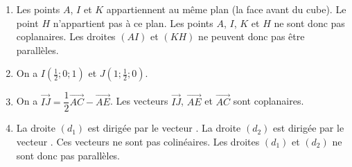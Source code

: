 \documentclass[11pt,fleqn, openany]{book} %
\begin{document}
\begin{solution}\hspace{0pt}

\begin{enumerate}
\item Les points $A$, $I$ et $K$ appartiennent au même plan (la face avant du cube). Le point $H$ n'appartient pas à ce plan. Les points $A$, $I$, $K$ et $H$ ne sont donc pas coplanaires. Les droites $(AI)$ et $(KH)$ ne peuvent donc pas être parallèles.
\item On a $I\left(\frac{1}{2};0;1\right)$ et $J\left(1;\frac{1}{2};0\right)$.
\item On a $\overrightarrow{IJ} = \dfrac{1}{2}\overrightarrow{AC} -  \overrightarrow{AE}$. Les vecteurs $\overrightarrow{IJ}$, $\overrightarrow{AE}$ et $\overrightarrow{AC}$ sont coplanaires.
\item La droite $(d_1)$ est dirigée par le vecteur . La droite $(d_2)$ est dirigée par le vecteur . Ces vecteurs ne sont pas colinéaires. Les droites $(d_1)$ et $(d_2)$ ne sont donc pas parallèles.
\end{enumerate}\end{solution}
\end{document}
